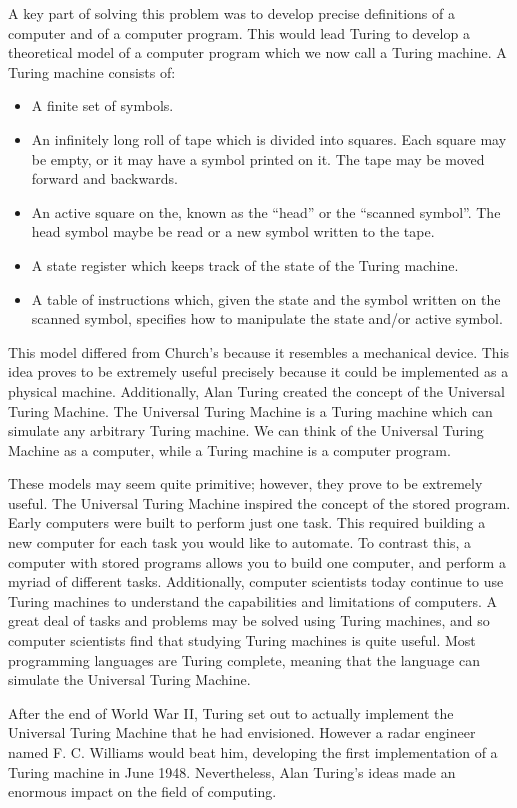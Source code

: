 \documentclass[12pt]{article}
\theoremstyle{mystyle}
\begin{document}
A key part of solving this problem was to develop precise definitions of a
computer and of a computer program. This would lead Turing to develop a
theoretical model of a computer program which we now call a Turing machine. A
Turing machine consists of:
\begin{itemize}
  \item A finite set of symbols.
  \item An infinitely long roll of tape which is divided into squares. Each
    square may be empty, or it may have a symbol printed on it. The tape may be
    moved forward and backwards.
  \item An active square on the, known as the ``head'' or the ``scanned
    symbol''. The head symbol maybe be read or a new symbol written to the tape.
  \item A state register which keeps track of the state of the Turing machine.
  \item A table of instructions which, given the state and the symbol written on
    the scanned symbol, specifies how to manipulate the state and/or active
    symbol.
\end{itemize}
This model differed from Church's because it resembles a mechanical device. This
idea proves to be extremely useful precisely because it could be implemented as
a physical machine. Additionally, Alan Turing created the concept of the
Universal Turing Machine. The Universal Turing Machine is a Turing machine which
can simulate any arbitrary Turing machine. We can think of the Universal Turing
Machine as a computer, while a Turing machine is a computer program. 

These models may seem quite primitive; however, they prove to be extremely
useful. The Universal Turing Machine inspired the concept of the stored program.
Early computers were built to perform just one task. This required building a
new computer for each task you would like to automate. To contrast this, a
computer with stored programs allows you to build one computer, and perform a
myriad of different tasks. Additionally, computer scientists today continue to
use Turing machines to understand the capabilities and limitations of computers.
A great deal of tasks and problems may be solved using Turing machines, and so
computer scientists find that studying Turing machines is quite useful. Most
programming languages are Turing complete, meaning that the language can
simulate the Universal Turing Machine.

After the end of World War II, Turing set out to actually implement the
Universal Turing Machine that he had envisioned. However a radar engineer named 
F. C. Williams would beat him, developing the first implementation of a 
Turing machine in June 1948. Nevertheless, Alan Turing's ideas made an enormous
impact on the field of computing.
\end{document}
